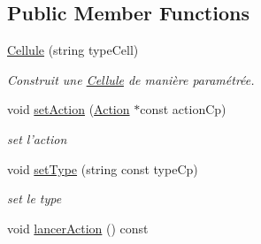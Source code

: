 \subsection*{Public Member Functions}
\begin{DoxyCompactItemize}
\item 
\hypertarget{classCellule_a9f480ee53c2989d4630bc211626b0821}{\hyperlink{classCellule_a9f480ee53c2989d4630bc211626b0821}{Cellule} (string type\-Cell)}\label{classCellule_a9f480ee53c2989d4630bc211626b0821}

\begin{DoxyCompactList}\small\item\em Construit une \hyperlink{classCellule}{Cellule} de manière paramétrée. \end{DoxyCompactList}\item 
\hypertarget{classCellule_a41bfeb9bd31e275207cc61a0eb60ced1}{void \hyperlink{classCellule_a41bfeb9bd31e275207cc61a0eb60ced1}{set\-Action} (\hyperlink{classAction}{Action} $\ast$const action\-Cp)}\label{classCellule_a41bfeb9bd31e275207cc61a0eb60ced1}

\begin{DoxyCompactList}\small\item\em set l'action \end{DoxyCompactList}\item 
\hypertarget{classCellule_a28d417e43668d097610a695c3a667a28}{void \hyperlink{classCellule_a28d417e43668d097610a695c3a667a28}{set\-Type} (string const type\-Cp)}\label{classCellule_a28d417e43668d097610a695c3a667a28}

\begin{DoxyCompactList}\small\item\em set le type \end{DoxyCompactList}\item 
\hypertarget{classCellule_a3b037a2dea9fd2904c9d8a98af8148fa}{void \hyperlink{classCellule_a3b037a2dea9fd2904c9d8a98af8148fa}{lancer\-Action} () const }\label{classCellule_a3b037a2dea9fd2904c9d8a98af8148fa}


\end{DoxyCompactItemize}
